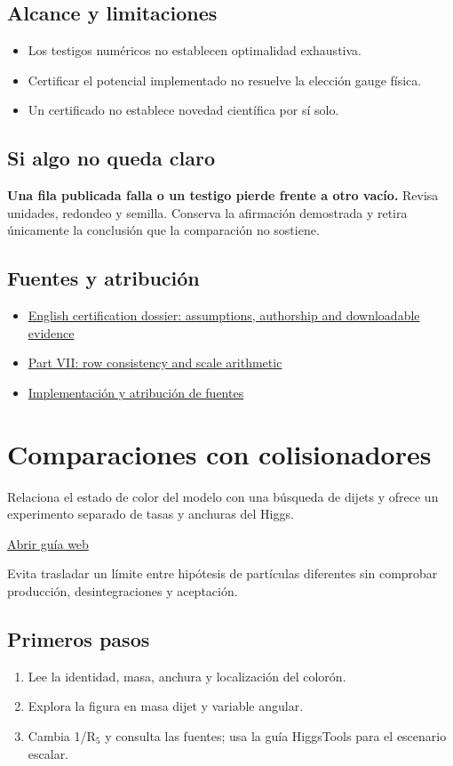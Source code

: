 \documentclass[11pt,a4paper]{article}
\begin{document}
\subsection*{Alcance y limitaciones}
\begin{itemize}
\item Los testigos numéricos no establecen optimalidad exhaustiva.
\item Certificar el potencial implementado no resuelve la elección gauge física.
\item Un certificado no establece novedad científica por sí solo.
\end{itemize}
\subsection*{Si algo no queda claro}
\textbf{Una fila publicada falla o un testigo pierde frente a otro vacío.} Revisa unidades, redondeo y semilla. Conserva la afirmación demostrada y retira únicamente la conclusión que la comparación no sostiene.

\subsection*{Fuentes y atribución}
\begin{itemize}
\item \href{https://karlesmarin.github.io/ghu-explorer/docs/su7-certification.html}{English certification dossier: assumptions, authorship and downloadable evidence}
\item \href{https://karlesmarin.github.io/ghu-explorer/papers/part-vii/index.html}{Part VII: row consistency and scale arithmetic}
\item \href{https://github.com/karlesmarin/ghu-lab/blob/main/src/sections/screen_section.js}{Implementación y atribución de fuentes}
\end{itemize}
\section{Comparaciones con colisionadores}
Relaciona el estado de color del modelo con una búsqueda de dijets y ofrece un experimento separado de tasas y anchuras del Higgs.

\href{https://karlesmarin.github.io/ghu-explorer/guide/es/collider/index.html}{Abrir guía web}

Evita trasladar un límite entre hipótesis de partículas diferentes sin comprobar producción, desintegraciones y aceptación.
\subsection*{Primeros pasos}
\begin{enumerate}
\item Lee la identidad, masa, anchura y localización del colorón.
\item Explora la figura en masa dijet y variable angular.
\item Cambia 1/R\ensuremath{{}_{5}} y consulta las fuentes; usa la guía HiggsTools para el escenario escalar.
\end{enumerate}
\end{document}
